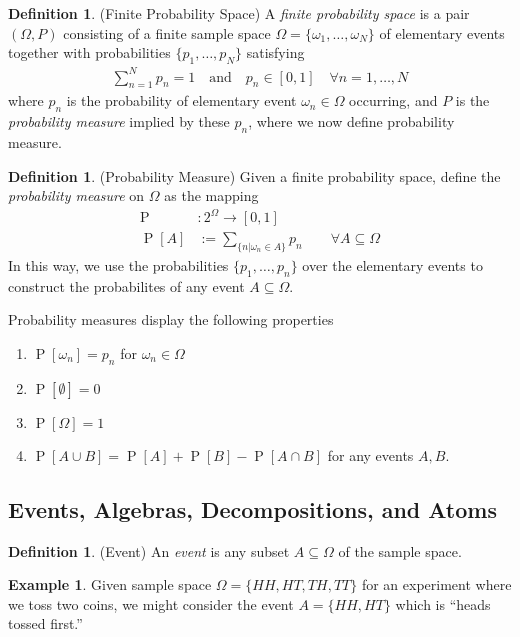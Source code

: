\documentclass[12pt]{article}
\theoremstyle{plain}
\theoremstyle{definition}
\newtheorem{defn}[thm]{Definition}
\newtheorem{ex}[thm]{Example}
\theoremstyle{remark}
\newcommand{\Prb}{\operatorname{P}}
\newcommand{\sumnN}{\sum^N_{n=1}}
\begin{document}
\begin{defn}{(Finite Probability Space)}
A \emph{finite probability space} is a pair $(\Omega,P)$ consisting of a
finite sample space $\Omega=\{\omega_1,\ldots,\omega_N\}$ of elementary
events together with probabilities $\{p_1,\ldots,p_N\}$ satisfying
\begin{align*}
  \sumnN p_n = 1
  \quad\text{and}\quad
  p_n \in [0,1] \quad \forall n=1,\ldots,N
\end{align*}
where $p_n$ is the probability of elementary event $\omega_n\in\Omega$
occurring, and $P$ is the \emph{probability measure} implied by these
$p_n$, where we now define probability measure.
\end{defn}

\begin{defn}{(Probability Measure)}
\label{defn:finitemeasure}
Given a finite probability space, define the \emph{probability measure}
on $\Omega$ as the mapping
\begin{align*}
  \Prb&: 2^\Omega \rightarrow [0,1] \\
  \Prb[A] &:= \sum_{\{n|\omega_n\in A\}} p_n
  \qquad \forall A\subseteq\Omega
\end{align*}
In this way, we use the probabilities $\{p_1,\ldots,p_n\}$ over the
elementary events to construct the probabilites of any event
$A\subseteq \Omega$.

Probability measures display the following properties
\begin{enumerate}
  \item $\Prb[\omega_n]=p_n$ for $\omega_n\in\Omega$
  \item $\Prb[\emptyset] = 0$
  \item $\Prb[\Omega] = 1$
  \item $\Prb[A\cup B] = \Prb[A] + \Prb[B] - \Prb[A\cap B]$ for any
    events $A,B$.
\end{enumerate}
\end{defn}


\clearpage
\subsection{Events, Algebras, Decompositions, and Atoms}

\begin{defn}{(Event)}
An \emph{event} is any subset $A\subseteq \Omega$ of the sample space.
\end{defn}
\begin{ex}
Given sample space $\Omega=\{HH,HT,TH,TT\}$ for an experiment where we
toss two coins, we might consider the event $A=\{HH,HT\}$ which is
``heads tossed first.''
\end{ex}
\end{document}
